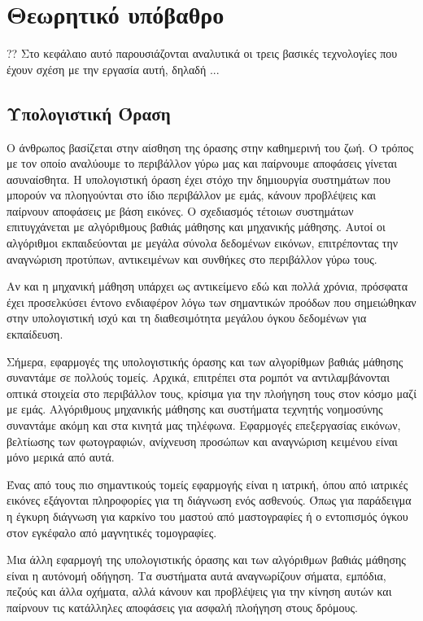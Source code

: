 \chapter{Θεωρητικό υπόβαθρο}
?? Στο κεφάλαιο αυτό παρουσιάζονται  αναλυτικά οι τρεις
βασικές τεχνολογίες που έχουν σχέση με την εργασία αυτή, δηλαδή ...

\section{Υπολογιστική Όραση}

Ο άνθρωπος βασίζεται στην αίσθηση της όρασης στην καθημερινή του ζωή. Ο τρόπος με τον οποίο αναλύουμε το περιβάλλον γύρω μας και παίρνουμε αποφάσεις γίνεται ασυναίσθητα. Η υπολογιστική όραση έχει στόχο την δημιουργία συστημάτων που μπορούν να πλοηγούνται στο ίδιο περιβάλλον με εμάς, κάνουν προβλέψεις και παίρνουν αποφάσεις με βάση εικόνες. Ο σχεδιασμός τέτοιων συστημάτων επιτυγχάνεται με αλγόριθμους βαθιάς μάθησης και μηχανικής μάθησης. Αυτοί οι αλγόριθμοι εκπαιδεύονται με μεγάλα σύνολα δεδομένων εικόνων, επιτρέποντας την αναγνώριση προτύπων, αντικειμένων και συνθήκες στο περιβάλλον γύρω τους.

Αν και η μηχανική μάθηση υπάρχει ως αντικείμενο εδώ και πολλά χρόνια, πρόσφατα έχει προσελκύσει έντονο ενδιαφέρον λόγω των σημαντικών προόδων που σημειώθηκαν στην υπολογιστική ισχύ και τη διαθεσιμότητα μεγάλου όγκου δεδομένων για εκπαίδευση.

Σήμερα, εφαρμογές της υπολογιστικής όρασης και των αλγορίθμων βαθιάς μάθησης συναντάμε σε πολλούς τομείς. Αρχικά, επιτρέπει στα ρομπότ να αντιλαμβάνονται οπτικά στοιχεία στο περιβάλλον τους, κρίσιμα για την πλοήγηση τους στον κόσμο μαζί με εμάς. Αλγόριθμους μηχανικής μάθησης και συστήματα τεχνητής νοημοσύνης συναντάμε ακόμη και στα κινητά μας τηλέφωνα. Εφαρμογές επεξεργασίας εικόνων, βελτίωσης των φωτογραφιών, ανίχνευση προσώπων και αναγνώριση κειμένου είναι μόνο μερικά από αυτά.

Ένας από τους πιο σημαντικούς τομείς εφαρμογής είναι η ιατρική, όπου από ιατρικές εικόνες εξάγονται πληροφορίες για τη διάγνωση ενός ασθενούς. Όπως για παράδειγμα η έγκυρη διάγνωση για καρκίνο του μαστού από μαστογραφίες ή ο εντοπισμός όγκου στον εγκέφαλο από μαγνητικές τομογραφίες.

Μια άλλη εφαρμογή της υπολογιστικής όρασης και των αλγόριθμων βαθιάς μάθησης είναι η αυτόνομή οδήγηση. Τα συστήματα αυτά αναγνωρίζουν σήματα, εμπόδια, πεζούς και άλλα οχήματα, αλλά κάνουν και προβλέψεις για την κίνηση αυτών και παίρνουν τις κατάλληλες αποφάσεις για ασφαλή πλοήγηση στους δρόμους.

